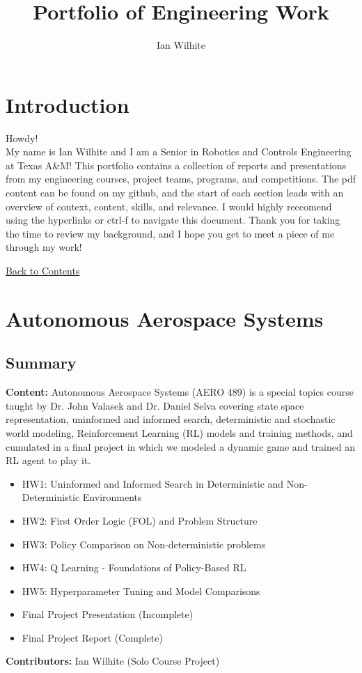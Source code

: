 \documentclass[a4paper,12pt]{article}
\title{Portfolio of Engineering Work}
\author{Ian Wilhite}
\begin{document}
\sloppy

\section*{Introduction}
Howdy! \\
My name is Ian Wilhite and I am a Senior in Robotics and Controls Engineering at Texas A\&M! This portfolio contains a collection of reports and presentations from my engineering courses, project teams, programs, and competitions. The pdf content can be found on my github, and the start of each section leads with an overview of context, content, skills, and relevance. I would highly reccomend using the hyperlinks or ctrl-f to navigate this document. 
Thank you for taking the time to review my background, and I hope you get to meet a piece of me through my work!

{}
\label{toc}
\tableofcontents
\newpage

\hyperlink{toc}{Back to Contents}
\section{Autonomous Aerospace Systems}
\subsection*{Summary}
\textbf{Content:} Autonomous Aerospace Systems (AERO 489) is a special topics course taught by Dr. John Valasek and Dr. Daniel Selva covering state space representation, uninformed and informed search, deterministic and stochastic world modeling, Reinforcement Learning (RL) models and training methods, and cumulated in a final project in which we modeled a dynamic game and trained an RL agent to play it. 
\begin{itemize}
    \item HW1: Uninformed and Informed Search in Deterministic and Non-Deterministic Environments 
    \item HW2: First Order Logic (FOL) and Problem Structure
    \item HW3: Policy Comparison on Non-deterministic problems
    \item HW4: Q Learning - Foundations of Policy-Based RL
    \item HW5: Hyperparameter Tuning and Model Comparisons  
    \item Final Project Presentation (Incomplete)
    \item Final Project Report (Complete)
\end{itemize}
\textbf{Contributors:} Ian Wilhite (Solo Course Project)
\end{document}
